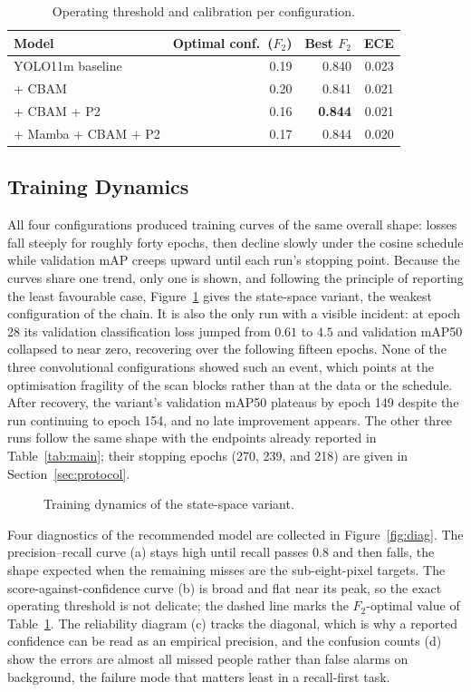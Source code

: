 \begin{table}[H]
  \centering
  \caption{Operating threshold and calibration per configuration.}
  \label{tab:thrcal}
  \begin{tabular}{@{}l r r r@{}}
    \toprule
    Model & Optimal conf.\ ($F_2$) & Best $F_2$ & ECE \\
    \midrule
    YOLO11m baseline    & 0.19 & 0.840 & 0.023 \\
    + CBAM              & 0.20 & 0.841 & 0.021 \\
    + CBAM + P2         & 0.16 & \textbf{0.844} & 0.021 \\
    + Mamba + CBAM + P2 & 0.17 & 0.844 & 0.020 \\
    \bottomrule
  \end{tabular}
\end{table}

\subsection{Training Dynamics}
All four configurations produced training curves of the same overall shape:
losses fall steeply for roughly forty epochs, then decline slowly under the
cosine schedule while validation mAP creeps upward until each run's stopping
point. Because the curves share one trend, only one is shown, and following
the principle of reporting the least favourable case, Figure~\ref{fig:training}
gives the state-space variant, the weakest configuration of the chain. It is
also the only run with a visible incident: at epoch 28 its validation
classification loss jumped from $0.61$ to $4.5$ and validation mAP50 collapsed
to near zero, recovering over the following fifteen epochs. None of the three
convolutional configurations showed such an event, which points at the
optimisation fragility of the scan blocks rather than at the data or the
schedule. After recovery, the variant's validation mAP50 plateaus by epoch
149 despite the run continuing to epoch 154, and no late improvement appears. The other three runs follow the same
shape with the endpoints already reported in Table~\ref{tab:main}; their
stopping epochs (270, 239, and 218) are given in Section~\ref{sec:protocol}.

\begin{figure}[H]
  \centering
  \caption{Training dynamics of the state-space variant.}
  \label{fig:training}
\end{figure}

Four diagnostics of the recommended model are collected in
Figure~\ref{fig:diag}. The precision--recall curve (a) stays high until
recall passes $0.8$ and then falls, the shape expected when the remaining
misses are the sub-eight-pixel targets. The score-against-confidence curve
(b) is broad and flat near its peak, so the exact operating threshold is not
delicate; the dashed line marks the $F_2$-optimal value of
Table~\ref{tab:thrcal}. The reliability diagram (c) tracks the diagonal,
which is why a reported confidence can be read as an empirical precision, and
the confusion counts (d) show the errors are almost all missed people rather
than false alarms on background, the failure mode that matters least in a
recall-first task.


